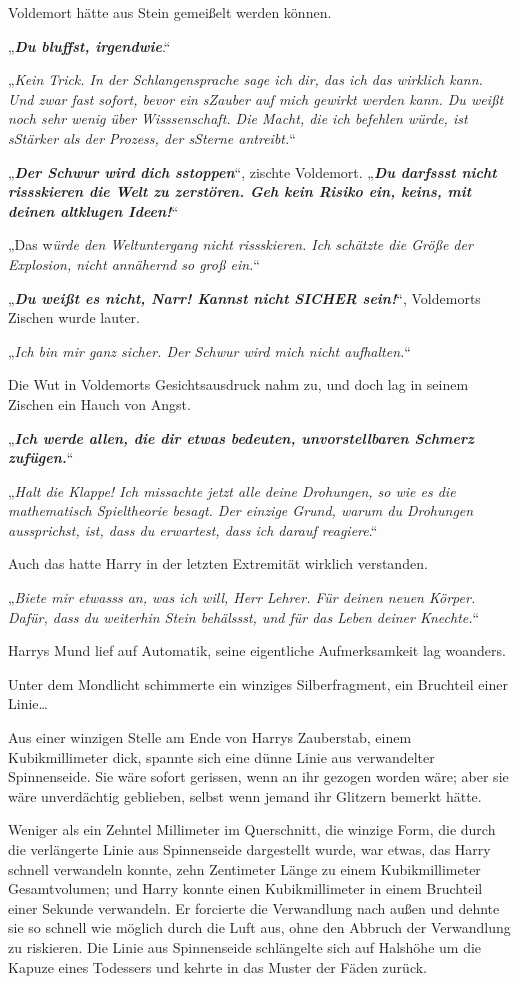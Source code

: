 {Voldemort hätte aus Stein gemeißelt werden können.

„\textbf{\emph{Du bluffst, irgendwie}}.“

„\emph{Kein Trick. In der Schlangensprache sage ich dir, das ich das wirklich kann. Und zwar fast sofort, bevor ein sZauber auf mich gewirkt werden kann. Du weißt noch sehr wenig über Wisssenschaft. Die Macht, die ich befehlen würde, ist sStärker als der Prozess, der sSterne antreibt.}“

„\textbf{\emph{Der Schwur wird dich sstoppen}}“, zischte Voldemort. „\textbf{\emph{Du darfssst nicht rissskieren die Welt zu zerstören. Geh kein Risiko ein, keins, mit deinen altklugen Ideen!}}“

„Das w\emph{ürde den Weltuntergang nicht rissskieren. Ich schätzte die Größe der Explosion, nicht annähernd so groß ein.}“

„\textbf{\emph{Du weißt es nicht, Narr! Kannst nicht SICHER sein!}}“, Voldemorts Zischen wurde lauter.

„\emph{Ich bin mir ganz sicher. Der Schwur wird mich nicht aufhalten.}“

Die Wut in Voldemorts Gesichtsausdruck nahm zu, und doch lag in seinem Zischen ein Hauch von Angst.

„\textbf{\emph{Ich werde allen, die dir etwas bedeuten, unvorstellbaren Schmerz zufügen.}}“

„\emph{Halt die Klappe! Ich missachte jetzt alle deine Drohungen, so wie es die mathematisch Spieltheorie besagt. Der einzige Grund, warum du Drohungen aussprichst, ist, dass du erwartest, dass ich darauf reagiere}.“

Auch das hatte Harry in der letzten Extremität wirklich verstanden.

„\emph{Biete mir etwasss an, was ich will, Herr Lehrer. Für deinen neuen Körper. Dafür, dass du weiterhin Stein behälssst, und für das Leben deiner Knechte.}“

Harrys Mund lief auf Automatik, seine eigentliche Aufmerksamkeit lag woanders.

Unter dem Mondlicht schimmerte ein winziges Silberfragment, ein Bruchteil einer Linie…

Aus einer winzigen Stelle am Ende von Harrys Zauberstab, einem Kubikmillimeter dick, spannte sich eine dünne Linie aus verwandelter Spinnenseide. Sie wäre sofort gerissen, wenn an ihr gezogen worden wäre; aber sie wäre unverdächtig geblieben, selbst wenn jemand ihr Glitzern bemerkt hätte.

Weniger als ein Zehntel Millimeter im Querschnitt, die winzige Form, die durch die verlängerte Linie aus Spinnenseide dargestellt wurde, war etwas, das Harry schnell verwandeln konnte, zehn Zentimeter Länge zu einem Kubikmillimeter Gesamtvolumen; und Harry konnte einen Kubikmillimeter in einem Bruchteil einer Sekunde verwandeln. Er forcierte die Verwandlung nach außen und dehnte sie so schnell wie möglich durch die Luft aus, ohne den Abbruch der Verwandlung zu riskieren. Die Linie aus Spinnenseide schlängelte sich auf Halshöhe um die Kapuze eines Todessers und kehrte in das Muster der Fäden zurück.

}
